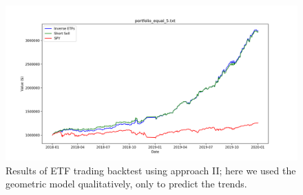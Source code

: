 \documentclass{article}
\begin{document}
\begin{figure}
\includegraphics[scale=0.42,bb=0 0 320 240]{figures/sorted-5-Equal-60-days-eval.png}
\caption{Results of ETF trading backtest using approach II; here we
  used the geometric model qualitatively, only to predict the trends.}
\label{fig:etf-results-approach-2}
\end{figure}
\end{document}
